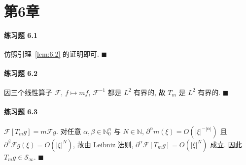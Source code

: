 \section*{第6章}

\paragraph*{练习题 6.1}
仿照引理~\ref{lem:6.2} 的证明即可. $\blacksquare$

\paragraph*{练习题 6.2}
因三个线性算子 $\mathcal{F}$, $f \mapsto mf$, $\mathcal{F}^{-1}$ 都是 $L^{2}$ 有界的, 故 $T_{m}$ 是 $L^{2}$ 有界的. $\blacksquare$

\paragraph*{练习题 6.3}
$\mathcal{F}[T_{m}g] = m\mathcal{F}g$. 对任意 $\alpha, \beta \in \mathbb{N}_{0}^{n}$ 与 $N \in \mathbb{N}$, $\partial^{\alpha}m(\xi) = O(|\xi|^{-|\alpha|})$ 且 $\partial^{\beta}\mathcal{F}g(\xi) = O(|\xi|^{N})$, 故由 Leibniz 法则, $\partial^{\alpha}\mathcal{F}[T_{m}g] = O(|\xi|^{N})$ 成立. 因此 $T_{m}g \in \mathcal{S}_{\infty}$. $\blacksquare$

